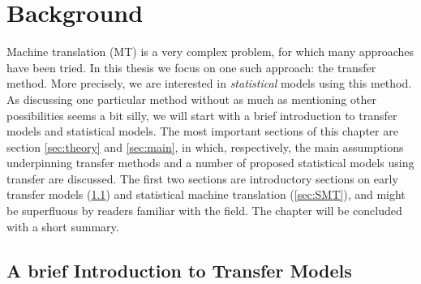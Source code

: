 \documentclass{report}
\theoremstyle{definition}
\theoremstyle{plain}
\begin{document}

\chapter{Background}

Machine translation (MT) is a very complex problem, for which many approaches have been tried. In this thesis we focus on one such approach: the transfer method. More precisely, we are interested in \textit{statistical} models using this method. As discussing one particular method without as much as mentioning other possibilities seems a bit silly, we will start with a brief introduction to transfer models and statistical models. The most important sections of this chapter are section \ref{sec:theory} and \ref{sec:main}, in which, respectively, the main assumptions underpinning transfer methods and a number of proposed statistical models using transfer are discussed. The first two sections are introductory sections on early transfer models (\ref{sec:intro}) and statistical machine translation (\ref{sec:SMT}), and might be superfluous by readers familiar with the field. The chapter will be concluded with a short summary.


\section{A brief Introduction to Transfer Models}
\label{sec:intro}
\end{document}
